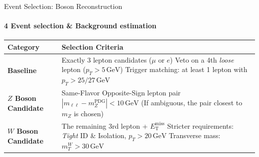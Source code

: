 \begin{frame}{Event Selection: Boson Reconstruction}
    \framesubtitle{4 Event selection \& Background estimation}
    \begin{table}[htbp]
    \centering
    \small
    \renewcommand{\arraystretch}{1.3}
    \begin{tabular}{p{3cm} p{7.5cm}}
    \hline
    \textbf{Category} & \textbf{Selection Criteria} \\
    \hline
    \textbf{Baseline} & Exactly 3 lepton candidates ($\mu$ or $e$) \newline
    Veto on a 4th \textit{loose} lepton ($p_T > 5\,\mathrm{GeV}$) \newline
    Trigger matching: at least 1 lepton with $p_T > 25/27\,\mathrm{GeV}$ \\
    \hline
    \textbf{$Z$ Boson Candidate} & Same-Flavor Opposite-Sign lepton pair \newline
    $|m_{\ell\ell} - m_Z^{\mathrm{PDG}}| < 10\,\mathrm{GeV}$ \newline (If ambiguous, the pair closest to $m_Z$ is chosen) \\
    \hline
    \textbf{$W$ Boson Candidate} & The remaining 3rd lepton + $E_{\mathrm{T}}^{\mathrm{miss}}$ \newline
    Stricter requirements: \textit{Tight} ID \& Isolation, $p_T > 20\,\mathrm{GeV}$ \newline
    Transverse mass: $m_T^W > 30\,\mathrm{GeV}$ \\
    \hline
    \end{tabular}
    \end{table}
\end{frame}




